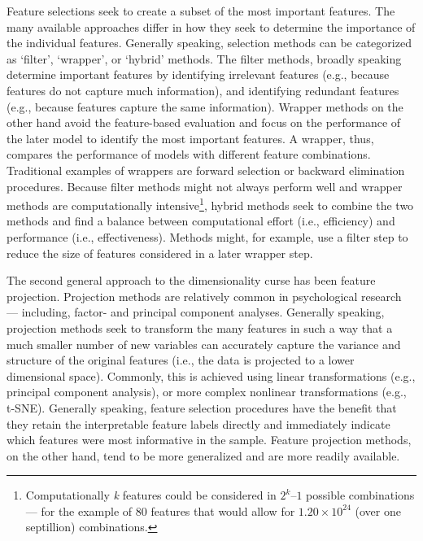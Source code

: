 \documentclass[man, 12pt, a4paper, mask, floatsintext]{apa7}
\theoremstyle{break}
\theoremstyle{plain}
\begin{document}
Feature selections seek to create a subset of the most important features. The many available approaches differ in how they seek to determine the importance of the individual features. Generally speaking, selection methods can be categorized as `filter', `wrapper', or `hybrid' methods. The filter methods, broadly speaking determine important features by identifying irrelevant features (e.g., because features do not capture much information), and identifying redundant features (e.g., because features capture the same information). Wrapper methods on the other hand avoid the feature-based evaluation and focus on the performance of the later model to identify the most important features. A wrapper, thus, compares the performance of models with different feature combinations. Traditional examples of wrappers are forward selection or backward elimination procedures. Because filter methods might not always perform well and wrapper methods are computationally intensive\footnote{Computationally \textit{k} features could be considered in \(2^k – 1\) possible combinations --- for the example of 80 features that would allow for \(1.20 \times 10^{24}\) (over one septillion) combinations.}, hybrid methods seek to combine the two methods and find a balance between computational effort (i.e., efficiency) and performance (i.e., effectiveness). Methods might, for example, use a filter step to reduce the size of features considered in a later wrapper step.

The second general approach to the dimensionality curse has been feature projection. Projection methods are relatively common in psychological research --- including, factor- and principal component analyses. Generally speaking, projection methods seek to transform the many features in such a way that a much smaller number of new variables can accurately capture the variance and structure of the original features (i.e., the data is projected to a lower dimensional space). Commonly, this is achieved using linear transformations (e.g., principal component analysis), or more complex nonlinear transformations (e.g., t-SNE). Generally speaking, feature selection procedures have the benefit that they retain the interpretable feature labels directly and immediately indicate which features were most informative in the sample. Feature projection methods, on the other hand, tend to be more generalized and are more readily available.


\end{document}
